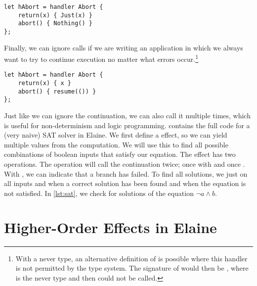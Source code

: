 \begin{lstlisting}[language=elaine, style=fancy]
let hAbort = handler Abort {
    return(x) { Just(x) }
    abort() { Nothing() }
};
\end{lstlisting}

Finally, we can ignore  calls if we are writing an application in which we always want to try to continue execution no matter what errors occur.\footnote{With a never type, an alternative definition of  is possible where this handler is not permitted by the type system. The signature of  would then be , where \el{!} is the never type and then  could not be called.}

\begin{lstlisting}[language=elaine, style=fancy]
let hAbort = handler Abort {
    return(x) { x }
    abort() { resume(()) }
};
\end{lstlisting}

Just like we can ignore the continuation, we can also call it multiple times, which is useful for non-determinism and logic programming.  contains the full code for a (very naive) SAT solver in Elaine. We first define a  effect, so we can yield multiple values from the computation. We will use this to find all possible combinations of boolean inputs that satisfy our equation. The  effect has two operations. The  operation will call the continuation twice; once with  and once . With , we can indicate that a branch has failed. To find all solutions, we just  on all inputs and  when a correct solution has been found and  when the equation is not satisfied. In \cref{lst:sat}, we check for solutions of the equation $\neg a \wedge b$.



\section{Higher-Order Effects in Elaine}



